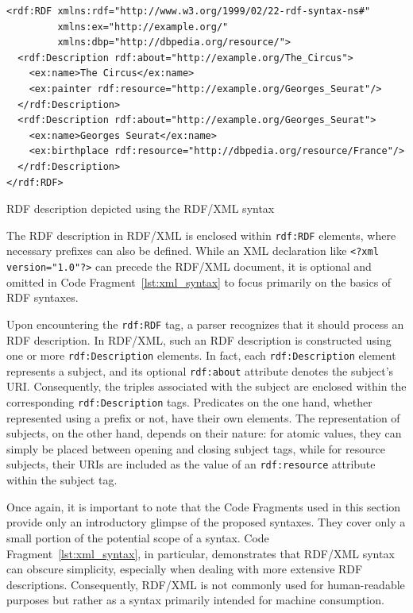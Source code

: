 \begin{itemize}
    \begin{listing}[htbp]
        \begin{verbatim}
<rdf:RDF xmlns:rdf="http://www.w3.org/1999/02/22-rdf-syntax-ns#"
         xmlns:ex="http://example.org/"
         xmlns:dbp="http://dbpedia.org/resource/">
  <rdf:Description rdf:about="http://example.org/The_Circus">
    <ex:name>The Circus</ex:name>
    <ex:painter rdf:resource="http://example.org/Georges_Seurat"/>
  </rdf:Description>
  <rdf:Description rdf:about="http://example.org/Georges_Seurat">
    <ex:name>Georges Seurat</ex:name>
    <ex:birthplace rdf:resource="http://dbpedia.org/resource/France"/>
  </rdf:Description>
</rdf:RDF>
        \end{verbatim}
        \caption{RDF description depicted using the RDF/XML syntax}
        \label{lst:xml_syntax}
    \end{listing}

    The RDF description in RDF/XML is enclosed within \texttt{rdf:RDF} elements, where necessary prefixes can also be defined. While an XML declaration like \texttt{<?xml version="1.0"?>} can precede the RDF/XML document, it is optional and omitted in Code Fragment~\ref{lst:xml_syntax} to focus primarily on the basics of RDF syntaxes. \citep{gandon2014xml}

    Upon encountering the \texttt{rdf:RDF} tag, a parser recognizes that it should process an RDF description. In RDF/XML, such an RDF description is constructed using one or more \texttt{rdf:Description} elements. In fact, each \texttt{rdf:Description} element represents a subject, and its optional \texttt{rdf:about} attribute denotes the subject's URI. Consequently, the triples associated with the subject are enclosed within the corresponding \texttt{rdf:Description} tags. Predicates on the one hand, whether represented using a prefix or not, have their own elements. The representation of subjects, on the other hand, depends on their nature: for atomic values, they can simply be placed between opening and closing subject tags, while for resource subjects, their URIs are included as the value of an \texttt{rdf:resource} attribute within the subject tag. \citep{gandon2014xml}

    Once again, it is important to note that the Code Fragments used in this section provide only an introductory glimpse of the proposed syntaxes. They cover only a small portion of the potential scope of a syntax. Code Fragment~\ref{lst:xml_syntax}, in particular, demonstrates that RDF/XML syntax can obscure simplicity, especially when dealing with more extensive RDF descriptions. Consequently, RDF/XML is not commonly used for human-readable purposes but rather as a syntax primarily intended for machine consumption. \citep{dongo2019srdf}


\end{itemize}
